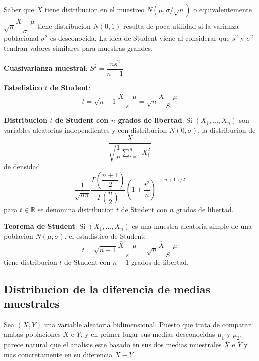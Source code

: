 \documentclass[10pt]{extarticle}
\newcommand{\R}{\mathbb{R}}
\newcommand{\<}{\langle}
\renewcommand{\>}{\rangle}
\theoremstyle{definition}
\begin{document}
Saber que $\overline{X}$ tiene distribucion en el muestreo $N(\mu, \sigma/\sqrt{n})$ o equivalentemente $\sqrt{n}\dfrac{\overline{X}-\mu}{\sigma}$ tiene distribucion $N(0,1)$ resulta de poca utilidad si la varianza poblacional $\sigma^2$ es desconocida. La idea de Student viene al considerar que $s^2$ y $\sigma^2$ tendran valores similares para muestras grandes.

\textbf{Cuasivarianza muestral}: $S^2=\dfrac{ns^2}{n-1}$

\textbf{Estadistico $t$ de Student}:
\begin{equation*}
  t = \sqrt{n-1}\dfrac{\overline{X} - \mu}{s} = \sqrt{n}\dfrac{\overline{X} - \mu}{S}
\end{equation*}

\textbf{Distribucion $t$ de Student con $n$ grados de libertad}: Si $(X_1,..., X_n)$ son variables aleatorias independientes y con distribucion $N(0, \sigma)$, la distribucion de
\begin{equation*}
  \dfrac{X}{\sqrt{\dfrac{1}{n} \sum_{i=1}^n X_i^2}}
\end{equation*}
de densidad
\begin{equation*}
  \dfrac{1}{\sqrt{n\pi}} \dfrac{\Gamma(\dfrac{n+1}{2})}{\Gamma(\dfrac{n}{2})} (1+\dfrac{t^2}{n})^{-(n+1)/2}
\end{equation*}
para $t \in \R$ se denomina distribucion $t$ de Student con $n$ grados de libertad.

\textbf{Teorema de Student}: Si $(X_1, ..., X_n)$ es una muestra aleatoria simple de una poblacion $N(\mu, \sigma)$, el estadistico de Student:
\begin{equation*}
  t = \sqrt{n-1}\dfrac{\overline{X} - \mu}{s} = \sqrt{n}\dfrac{\overline{X} - \mu}{S}
\end{equation*}
tiene distribucion $t$ de Student con $n-1$ grados de libertad.

\subsection*{Distribucion de la diferencia de medias muestrales}

Sea $(X,Y)$ una variable aleatoria bidimensional. Puesto que trata de comparar ambas poblaciones $X$ e $Y$, y en primer lugar sus medias desconocidas $\mu_1$ y $\mu_2$, parece natural que el analisis este basado en sus dos medias muestrales $\overline{X}$ e $\overline{Y}$ y mas concretamente en su diferencia $\overline{X} - \overline{Y}$.
\end{document}
